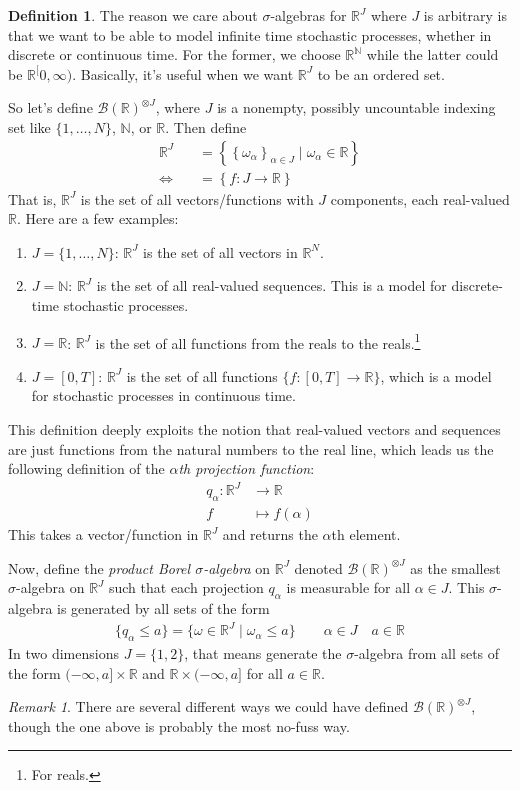 \documentclass[12pt]{article}
\theoremstyle{plain}
\theoremstyle{definition}
\newtheorem{defn}[thm]{Definition}
\theoremstyle{remark}
\newtheorem*{rmk}{Remark}
\newcommand{\ra}{\rightarrow}
\newcommand{\sB}{\mathscr{B}}
\newcommand{\R}{\mathbb{R}}
\newcommand{\N}{\mathbb{N}}
\begin{document}
\begin{defn}
The reason we care about $\sigma$-algebras for $\R^J$ where $J$ is
arbitrary is that we want to be able to model infinite time stochastic
processes, whether in discrete or continuous time. For the former, we
choose $\R^\N$ while the latter could be $\R^[0,\infty)$. Basically,
it's useful when we want $\R^J$ to be an ordered set.

So let's define $\sB(\R)^{\otimes J}$, where $J$ is a nonempty, possibly
uncountable indexing set like $\{1,\ldots,N\}$, $\N$, or $\R$. Then
define
\begin{align*}
  \R^J &=
  \left\{
    \left\{ \omega_\alpha \right\}_{\alpha\in J}
    \; | \;
    \omega_\alpha \in \R
  \right\} \\
  \Leftrightarrow\quad
  &=
  \left\{
    f: J \ra \R
  \right\}
\end{align*}
That is, $\R^J$ is the set of all vectors/functions with $J$ components,
each real-valued $\R$. Here are a few examples:
\begin{enumerate}
  \item $J=\{1,\ldots,N\}$: $\R^J$ is the set of all vectors in $\R^N$.
  \item $J=\N$: $\R^J$ is the set of all real-valued sequences. This is
    a model for discrete-time stochastic processes.
  \item $J=\R$: $\R^J$ is the set of all functions from the reals to the
    reals.\footnote{For reals.}
  \item $J=[0,T]$: $\R^J$ is the set of all functions
    $\{f:[0,T]\ra\R\}$, which is a model for stochastic processes in
    continuous time.
\end{enumerate}
This definition deeply exploits the notion that real-valued vectors and
sequences are just functions from the natural numbers to the real line,
which leads us the following definition of the
\emph{$\alpha$th projection function}:
\begin{align*}
  q_\alpha: \R^J &\ra \R \\
  f &\mapsto f(\alpha)
\end{align*}
This takes a vector/function in $\R^J$ and returns the $\alpha$th
element.

Now, define the \emph{product Borel $\sigma$-algebra} on $\R^J$ denoted
$\sB(\R)^{\otimes J}$ as the smallest $\sigma$-algebra on $\R^J$ such
that each projection $q_\alpha$ is measurable for all $\alpha\in J$.
This $\sigma$-algebra is generated by all sets of the form
\begin{align*}
  \{q_{\alpha}\leq a\}
  =
  \{\omega \in \R^J \;|\; \omega_\alpha \leq a\}
  \qquad \alpha \in J\quad a \in\R
\end{align*}
In two dimensions $J=\{1,2\}$, that means generate the $\sigma$-algebra
from all sets of the form $(-\infty,a]\times \R$ and $\R \times
(-\infty,a]$ for all $a\in \R$.
\end{defn}
\begin{rmk}
There are several different ways we could have defined
$\sB(\R)^{\otimes J}$, though the one above is probably the most no-fuss
way.
\end{rmk}
\end{document}
